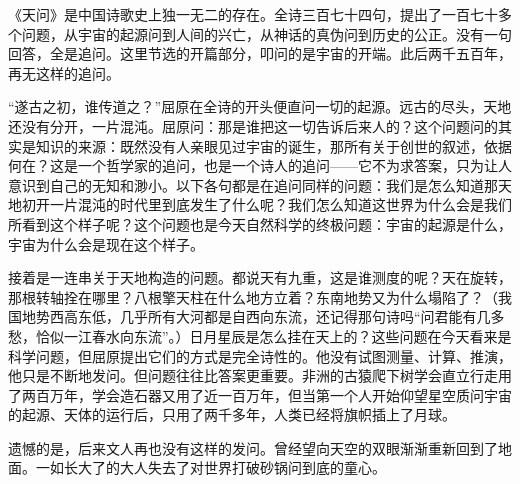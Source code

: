 \begin{appreciation}
《天问》是中国诗歌史上独一无二的存在。全诗三百七十四句，提出了一百七十多个问题，从宇宙的起源问到人间的兴亡，从神话的真伪问到历史的公正。没有一句回答，全是追问。这里节选的开篇部分，叩问的是宇宙的开端。此后两千五百年，再无这样的追问。

“遂古之初，谁传道之？”屈原在全诗的开头便直问一切的起源。远古的尽头，天地还没有分开，一片混沌。屈原问：那是谁把这一切告诉后来人的？这个问题问的其实是知识的来源：既然没有人亲眼见过宇宙的诞生，那所有关于创世的叙述，依据何在？这是一个哲学家的追问，也是一个诗人的追问——它不为求答案，只为让人意识到自己的无知和渺小。以下各句都是在追问同样的问题：我们是怎么知道那天地初开一片混沌的时代里到底发生了什么呢？我们怎么知道这世界为什么会是我们所看到这个样子呢？这个问题也是今天自然科学的终极问题：宇宙的起源是什么，宇宙为什么会是现在这个样子。

接着是一连串关于天地构造的问题。都说天有九重，这是谁测度的呢？天在旋转，那根转轴拴在哪里？八根擎天柱在什么地方立着？东南地势又为什么塌陷了？（我国地势西高东低，几乎所有大河都是自西向东流，还记得那句诗吗“问君能有几多愁，恰似一江春水向东流”。）日月星辰是怎么挂在天上的？这些问题在今天看来是科学问题，但屈原提出它们的方式是完全诗性的。他没有试图测量、计算、推演，他只是不断地发问。但问题往往比答案更重要。非洲的古猿爬下树学会直立行走用了两百万年，学会造石器又用了近一百万年，但当第一个人开始仰望星空质问宇宙的起源、天体的运行后，只用了两千多年，人类已经将旗帜插上了月球。

遗憾的是，后来文人再也没有这样的发问。曾经望向天空的双眼渐渐重新回到了地面。一如长大了的大人失去了对世界打破砂锅问到底的童心。
\end{appreciation}
